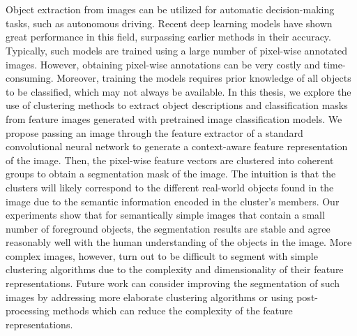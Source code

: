 \chapter{\abstractname}

Object extraction from images can be utilized for automatic decision-making tasks, such as autonomous driving. Recent deep learning models have shown great performance in this field, surpassing earlier methods in their accuracy. Typically, such models are trained using a large number of pixel-wise annotated images. However, obtaining pixel-wise annotations can be very costly and time-consuming. Moreover, training the models requires prior knowledge of all objects to be classified, which may not always be available. In this thesis, we explore the use of clustering methods to extract object descriptions and classification masks from feature images generated with pretrained image classification models. We propose passing an image through the feature extractor of a standard convolutional neural network to generate a context-aware feature representation of the image. Then, the pixel-wise feature vectors are clustered into coherent groups to obtain a segmentation mask of the image. The intuition is that the clusters will likely correspond to the different real-world objects found in the image due to the semantic information encoded in the cluster's members. Our experiments show that for semantically simple images that contain a small number of foreground objects, the segmentation results are stable and agree reasonably well with the human understanding of the objects in the image. More complex images, however, turn out to be difficult to segment with simple clustering algorithms due to the complexity and dimensionality of their feature representations. Future work can consider improving the segmentation of such images by addressing more elaborate clustering algorithms or using post-processing methods which can reduce the complexity of the feature representations.